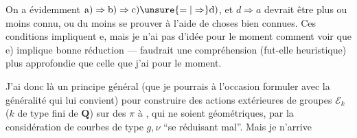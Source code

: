 On a évidemment $\mathrm{a)}\Rightarrow\mathrm{b)}\Rightarrow\mathrm{c)}\unsure{=|\Rightarrow}\mathrm{d)}$, et $d\Rightarrow a$ devrait être plus ou moins connu, ou du moins se prouver à l'aide de choses bien connues. Ces conditions impliquent e, mais je n'ai pas d'idée pour le moment comment voir que e) implique bonne réduction --- faudrait une compréhension (fut-elle heuristique) plus approfondie que celle que j'ai pour le moment.

J'ai donc là un principe général (que je pourrais à l'occasion formuler avec la généralité qui lui convient) pour construire des actions extérieures  de groupes $\mathcal E_k$ ($k$  de type fini de $\mathbf Q$) sur des $\pi$ à , qui  ne soient géométriques, par  la considération de courbes de type $g,\nu$ ``se réduisant mal''. Mais je n'arrive
